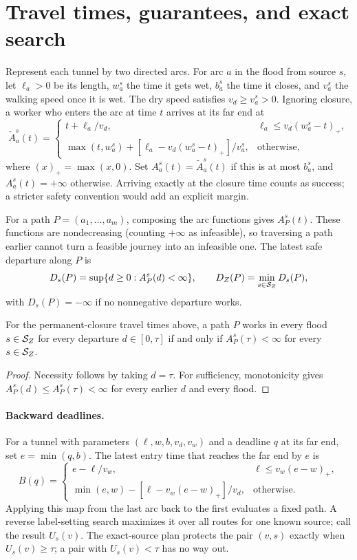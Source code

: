 \section{Travel times, guarantees, and exact search}\label{app:math}
Represent each tunnel by two directed arcs. For arc $a$ in the flood from source $s$, let $\ell_a>0$ be its length, $w_a^s$ the time it gets wet, $b_a^s$ the time it closes, and $v_a^s$ the walking speed once it is wet. The dry speed satisfies $v_d\ge v_a^s>0$. Ignoring closure, a worker who enters the arc at time $t$ arrives at its far end at
\[
 \widetilde A_a^s(t)=
 \begin{cases}
 t+\ell_a/v_d,&\ell_a\le v_d(w_a^s-t)_+,\\
 \max(t,w_a^s)+[\ell_a-v_d(w_a^s-t)_+]/v_a^s,&\text{otherwise},
 \end{cases}
\]
where $(x)_+=\max(x,0)$. Set $A_a^s(t)=\widetilde A_a^s(t)$ if this is at most $b_a^s$, and $A_a^s(t)=+\infty$ otherwise. Arriving exactly at the closure time counts as success; a stricter safety convention would add an explicit margin.

For a path $P=(a_1,\ldots,a_m)$, composing the arc functions gives $A_P^s(t)$. These functions are nondecreasing (counting $+\infty$ as infeasible), so traversing a path earlier cannot turn a feasible journey into an infeasible one. The latest safe departure along $P$ is
\[
 D_s(P)=\sup\{d\ge0:A_P^s(d)<\infty\},\qquad
 D_Z(P)=\min_{s\in\mathcal{S}_Z}D_s(P),
\]
with $D_s(P)=-\infty$ if no nonnegative departure works.

\begin{proposition}
For the permanent-closure travel times above, a path $P$ works in every flood $s\in\mathcal{S}_Z$ for every departure $d\in[0,\tau]$ if and only if $A_P^s(\tau)<\infty$ for every $s\in\mathcal{S}_Z$.
\end{proposition}
\begin{proof}
Necessity follows by taking $d=\tau$. For sufficiency, monotonicity gives $A_P^s(d)\le A_P^s(\tau)<\infty$ for every earlier $d$ and every flood.
\end{proof}

\paragraph{Backward deadlines.}
For a tunnel with parameters $(\ell,w,b,v_d,v_w)$ and a deadline $q$ at its far end, set $e=\min(q,b)$. The latest entry time that reaches the far end by $e$ is
\[
 B(q)=\begin{cases}
 e-\ell/v_w,&\ell\le v_w(e-w)_+,\\
 \min(e,w)-[\ell-v_w(e-w)_+]/v_d,&\text{otherwise}.
 \end{cases}
\]
Applying this map from the last arc back to the first evaluates a fixed path. A reverse label-setting search maximizes it over all routes for one known source; call the result $U_s(v)$. The exact-source plan protects the pair $(v,s)$ exactly when $U_s(v)\ge\tau$; a pair with $U_s(v)<\tau$ has no way out.

